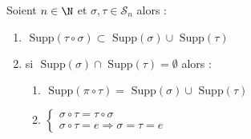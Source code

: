 \newpage 

\begin{prop}
	Soient $ n \in \N$ et $\sigma,\tau \in \mathcal{S}_n$ alors :
	\begin{enumerate}
		\item $ \text{ Supp} (\tau \circ \sigma) \subset \text{ Supp}(\sigma) \cup \text{ Supp}(\tau)$
		\item si $\text{ Supp}(\sigma) \cap \text{ Supp}(\tau) = \emptyset$ alors :
				\begin{enumerate}
						\item $\text{ Supp}(\pi \circ \tau) = \text{ Supp}(\sigma) \cup \text{ Supp}(\tau)$ 
						\item $
							\begin{cases}
			   					\sigma \circ \tau = \tau \circ \sigma \\
								\sigma \circ \tau = e \Longrightarrow \sigma = \tau = e
							\end{cases} $
				\end{enumerate}
	\end{enumerate}
\end{prop}

